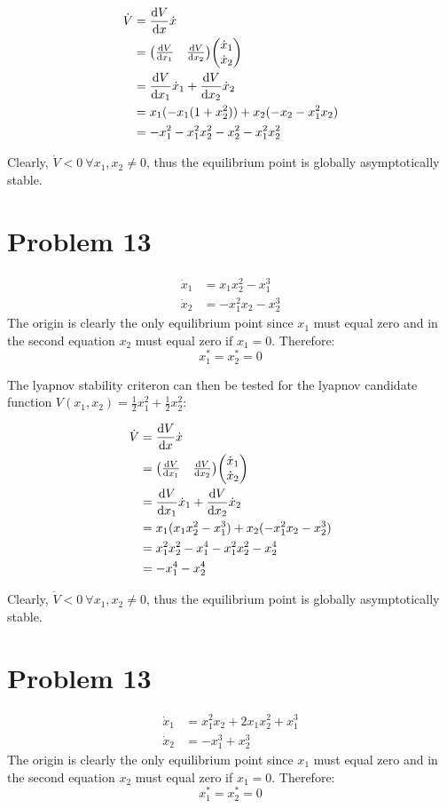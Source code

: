 \documentclass[]{article}
\begin{document}
\begin{align*}
	\dot{V} &= \dv{V}{x} \dot{x}\\
	&= \mqty(\dv{V}{x_1} & \dv{V}{x_2}) \mqty(\dot{x}_1\\ \dot{x}_2)\\
	&= \dv{V}{x_1} \dot{x}_1 + \dv{V}{x_2} \dot{x}_2\\
	&= x_1 (-x_1 (1 + x_2^2)) + x_2 (-x_2 - x_1^2 x_2)\\
	&= -x_1^2 - x_1^2 x_2^2 -x_2^2 - x_1^2 x_2^2
\end{align*}

Clearly, $\dot{V} < 0 \ \forall x_1 , x_2 \neq 0$, thus the equilibrium point is globally asymptotically stable.


\newpage
\section{Problem 13}
\begin{align*}
	\dot{x}_1 &= x_1x_2^2 - x_1^3\\
	\dot{x}_2 &= -x_1^2 x_2 - x_2^3
\end{align*}
The origin is clearly the only equilibrium point since $x_1$ must equal zero and in the second equation $x_2$ must equal zero if $x_1 = 0$. Therefore:
\begin{displaymath}
	x_1^* = x_2^* = 0
\end{displaymath}

The lyapnov stability criteron can then be tested for the lyapnov candidate function  $V(x_1, x_2) = \frac{1}{2} x_1^2 + \frac{1}{2} x_2^2$:

\begin{align*}
	\dot{V} &= \dv{V}{x} \dot{x}\\
	&= \mqty(\dv{V}{x_1} & \dv{V}{x_2}) \mqty(\dot{x}_1\\ \dot{x}_2)\\
	&= \dv{V}{x_1} \dot{x}_1 + \dv{V}{x_2} \dot{x}_2\\
	&= x_1 (x_1x_2^2 - x_1^3) + x_2 (-x_1^2 x_2 - x_2^3)\\
	&= x_1^2 x_2^2 - x_1^4 - x_1^2 x_2^2 - x_2^4\\
	&= -x_1^4 - x_2^4
\end{align*}

Clearly, $\dot{V} < 0 \ \forall x_1 , x_2 \neq 0$, thus the equilibrium point is globally asymptotically stable.


\section{Problem 13}
\begin{align*}
	\dot{x}_1 &= x_1^2 x_2 + 2 x_1 x_2^2 + x_1^3\\
	\dot{x}_2 &= -x_1^3 + x_2^3
\end{align*}
The origin is clearly the only equilibrium point since $x_1$ must equal zero and in the second equation $x_2$ must equal zero if $x_1 = 0$. Therefore:
\begin{displaymath}
	x_1^* = x_2^* = 0
\end{displaymath}
\end{document}
